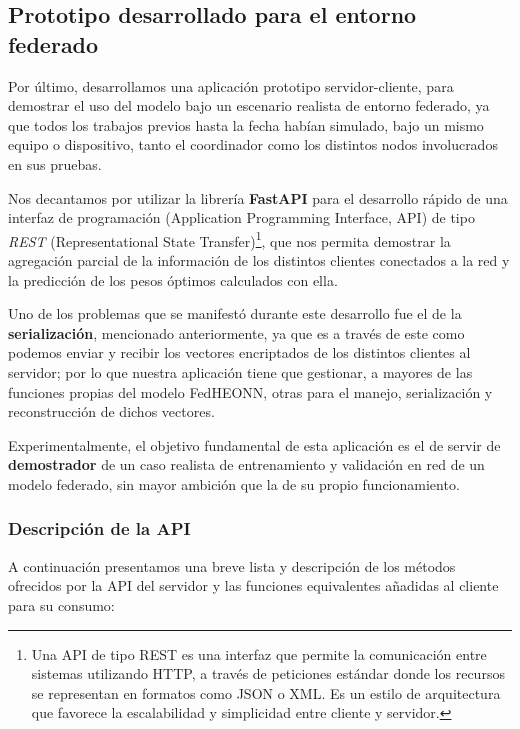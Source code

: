 \documentclass[00-Trabajo_Final.tex]{subfiles}
\begin{document}
\subsection{Prototipo desarrollado para el entorno federado} \label{sec:servidor_sol}
Por último, desarrollamos una aplicación prototipo servidor-cliente, para demostrar el uso del modelo bajo un escenario realista de entorno federado, ya que todos los trabajos previos hasta la fecha habían simulado,  bajo un mismo equipo o dispositivo, tanto el coordinador como los distintos nodos involucrados en sus pruebas.

\vspace{0.5em}

Nos decantamos por utilizar la librería \textbf{FastAPI} para el desarrollo rápido de una interfaz de programación (Application Programming Interface, API) de tipo \textit{REST} (Representational State Transfer)\footnote{Una API de tipo REST es una interfaz que permite la comunicación entre sistemas utilizando HTTP, a través de peticiones estándar donde los recursos se representan en formatos como JSON o XML. Es un estilo de arquitectura que favorece la escalabilidad y simplicidad entre cliente y servidor.}, que nos permita demostrar la agregación parcial de la información de los distintos clientes conectados a la red y la predicción de los pesos óptimos calculados con ella.

\vspace{0.5em}

Uno de los problemas que se manifestó durante este desarrollo fue el de la \textbf{serialización}, mencionado anteriormente, ya que es a través de este como podemos enviar y recibir los vectores encriptados de los distintos clientes al servidor; por lo que nuestra aplicación tiene que gestionar, a mayores de las funciones propias del modelo FedHEONN, otras para el manejo, serialización y reconstrucción de dichos vectores.

\vspace{0.5em}

Experimentalmente, el objetivo fundamental de esta aplicación es el de servir de \textbf{demostrador} de un caso realista de entrenamiento y validación en red de un modelo federado, sin mayor ambición que la de su propio funcionamiento.

\subsubsection*{Descripción de la API}
A continuación presentamos una breve lista y descripción de los métodos ofrecidos por la API del servidor y las funciones equivalentes añadidas al cliente para su consumo:
\end{document}
